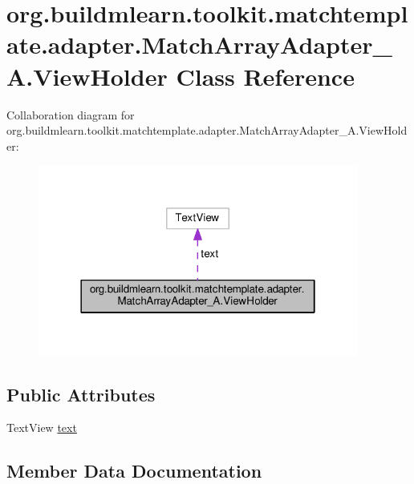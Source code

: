 \hypertarget{classorg_1_1buildmlearn_1_1toolkit_1_1matchtemplate_1_1adapter_1_1MatchArrayAdapter__A_1_1ViewHolder}{}\section{org.\+buildmlearn.\+toolkit.\+matchtemplate.\+adapter.\+Match\+Array\+Adapter\+\_\+\+A.\+View\+Holder Class Reference}
\label{classorg_1_1buildmlearn_1_1toolkit_1_1matchtemplate_1_1adapter_1_1MatchArrayAdapter__A_1_1ViewHolder}


Collaboration diagram for org.\+buildmlearn.\+toolkit.\+matchtemplate.\+adapter.\+Match\+Array\+Adapter\+\_\+\+A.\+View\+Holder\+:
\nopagebreak
\begin{figure}[H]
\begin{center}
\leavevmode
\includegraphics[width=298pt]{classorg_1_1buildmlearn_1_1toolkit_1_1matchtemplate_1_1adapter_1_1MatchArrayAdapter__A_1_1ViewHolder__coll__graph}
\end{center}
\end{figure}
\subsection*{Public Attributes}
\begin{DoxyCompactItemize}
\item 
Text\+View \hyperlink{classorg_1_1buildmlearn_1_1toolkit_1_1matchtemplate_1_1adapter_1_1MatchArrayAdapter__A_1_1ViewHolder_a5853d6adf91720db5166a4ddd81a3cca}{text}
\end{DoxyCompactItemize}


\subsection{Member Data Documentation}
